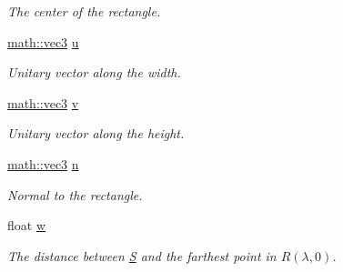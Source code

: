 \begin{DoxyCompactItemize}
\begin{DoxyCompactList}\small\item\em The center of the rectangle. \end{DoxyCompactList}\item 
\mbox{\label{classphysim_1_1emitters_1_1free__emitters_1_1rect__source_a692e4b1fd9e74b5c7692cad3f0c184c4}} 
\hyperlink{structphysim_1_1math_1_1vec3}{math\+::vec3} \hyperlink{classphysim_1_1emitters_1_1free__emitters_1_1rect__source_a692e4b1fd9e74b5c7692cad3f0c184c4}{u}
\begin{DoxyCompactList}\small\item\em Unitary vector along the width. \end{DoxyCompactList}\item 
\mbox{\label{classphysim_1_1emitters_1_1free__emitters_1_1rect__source_a9540156884818d3f6b0ed86a1b0902d0}} 
\hyperlink{structphysim_1_1math_1_1vec3}{math\+::vec3} \hyperlink{classphysim_1_1emitters_1_1free__emitters_1_1rect__source_a9540156884818d3f6b0ed86a1b0902d0}{v}
\begin{DoxyCompactList}\small\item\em Unitary vector along the height. \end{DoxyCompactList}\item 
\hyperlink{structphysim_1_1math_1_1vec3}{math\+::vec3} \hyperlink{classphysim_1_1emitters_1_1free__emitters_1_1rect__source_a0ce1fc34b505b94cdbc22cdb05047142}{n}
\begin{DoxyCompactList}\small\item\em Normal to the rectangle. \end{DoxyCompactList}\item 
\mbox{\label{classphysim_1_1emitters_1_1free__emitters_1_1rect__source_ab6e88219088b1048622242f7f2d03f91}} 
float \hyperlink{classphysim_1_1emitters_1_1free__emitters_1_1rect__source_ab6e88219088b1048622242f7f2d03f91}{w}
\begin{DoxyCompactList}\small\item\em The distance between \hyperlink{classphysim_1_1emitters_1_1free__emitters_1_1rect__source_a0d958945449e9d31e95b154f942b21ca}{S} and the farthest point in $R(\lambda,0)$. \end{DoxyCompactList}\item 

\end{DoxyCompactItemize}
